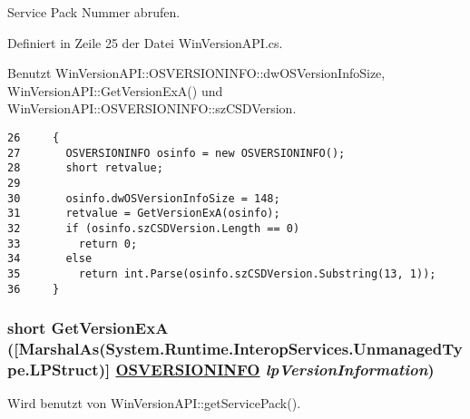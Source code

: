 Service Pack Nummer abrufen. 



Definiert in Zeile 25 der Datei Win\-Version\-API.cs.

Benutzt Win\-Version\-API::OSVERSIONINFO::dw\-OSVersion\-Info\-Size, Win\-Version\-API::Get\-Version\-Ex\-A() und Win\-Version\-API::OSVERSIONINFO::sz\-CSDVersion.



\footnotesize\begin{verbatim}26     {
27       OSVERSIONINFO osinfo = new OSVERSIONINFO();
28       short retvalue;
29 
30       osinfo.dwOSVersionInfoSize = 148;
31       retvalue = GetVersionExA(osinfo);
32       if (osinfo.szCSDVersion.Length == 0)
33         return 0;
34       else
35         return int.Parse(osinfo.szCSDVersion.Substring(13, 1));   
36     }
\end{verbatim}\normalsize 
\hypertarget{classQbeSAS_1_1WinVersionAPI_QbeSAS_1_1WinVersionAPIh0}{
\subsubsection[GetVersionExA]{\setlength{\rightskip}{0pt plus 5cm}short Get\-Version\-Ex\-A (\mbox{[}Marshal\-As(System.Runtime.Interop\-Services.Unmanaged\-Type.LPStruct)\mbox{]} \hyperlink{classQbeSAS_1_1WinVersionAPI_1_1OSVERSIONINFO}{OSVERSIONINFO} {\em lp\-Version\-Information})}}
\label{classQbeSAS_1_1WinVersionAPI_QbeSAS_1_1WinVersionAPIh0}




Wird benutzt von Win\-Version\-API::get\-Service\-Pack().